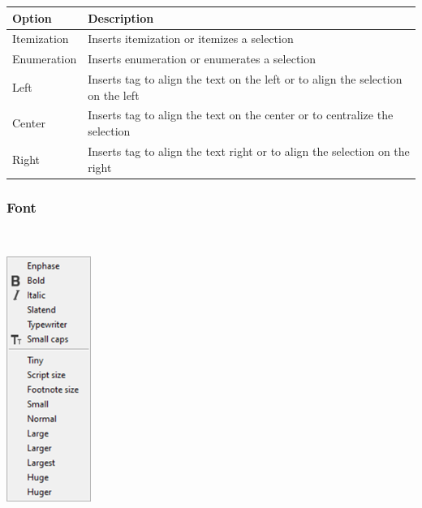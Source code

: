 \begin{scriptsize}
  \begin{tabularx}{\textwidth}{>{\hsize=0.2\hsize}X>{\hsize=0.8\hsize}X}\\
    \hline
    \textbf{Option} & \textbf{Description} \\
    \hline
    Itemization & Inserts itemization or itemizes a selection \\
    Enumeration & Inserts enumeration or enumerates a selection \\
    Left & Inserts tag to align the text on the left or to align the selection on the left \\
    Center & Inserts tag to align the text on the center or to centralize the selection \\
    Right & Inserts tag to align the text right or to align the selection on the right \\
    \hline
  \end{tabularx}
\end{scriptsize}


\newpage
\hypertarget{menu_insert_latex_font}{}
\subsubsection{Font}\\

\includegraphics[scale=0.50]{./res/menu_insert_latex_font.png}\\


